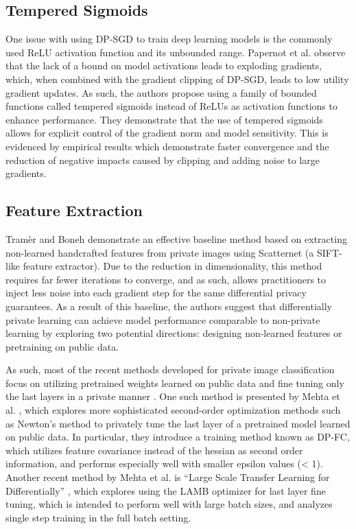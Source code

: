 \documentclass{article}
\begin{document}
\subsection{Tempered Sigmoids}
One issue with using DP-SGD to train deep learning models is the commonly used ReLU activation function and its unbounded range. Papernot et al. \cite{sig} observe that the lack of a bound on model activations leads to exploding gradients, which, when combined with the gradient clipping of DP-SGD, leads to low utility gradient updates. As such, the authors propose using a family of bounded functions called tempered sigmoids instead of ReLUs as activation functions to enhance performance. They demonstrate that the use of tempered sigmoids allows for explicit control of the gradient norm and model sensitivity. This is evidenced by empirical results which demonstrate faster convergence and the reduction of negative impacts caused by clipping and adding noise to large gradients.


\subsection{Feature Extraction}
Tramèr and Boneh \cite{features} demonstrate an effective baseline method based on extracting non-learned handcrafted features from private images using Scatternet \cite{scatter} (a SIFT-like feature extractor). Due to the reduction in dimensionality, this method requires far fewer iterations to converge, and as such, allows practitioners to inject less noise into each gradient step for the same differential privacy guarantees. As a result of this baseline, the authors suggest that differentially private learning can achieve model performance comparable to non-private learning by exploring two potential directions: designing non-learned features or pretraining on public data.

As such, most of the recent methods developed for private image classification focus on utilizing pretrained weights learned on public data and fine tuning only the last layers in a private manner \cite{transfer} \cite{2nd_order}. One such method is presented by Mehta et al. \cite{2nd_order}, which explores more sophisticated second-order optimization methods such as Newton’s method to privately tune the last layer of a pretrained model learned on public data. In particular, they introduce a training method known as DP-FC, which utilizes feature covariance instead of the hessian as second order information, and performs especially well with smaller epsilon values (< 1). Another recent method by Mehta et al. is “Large Scale Transfer Learning for Differentially” \cite{transfer}, which explores using the LAMB optimizer for last layer fine tuning, which is intended to perform well with large batch sizes, and analyzes single step training in the full batch setting.
\end{document}
